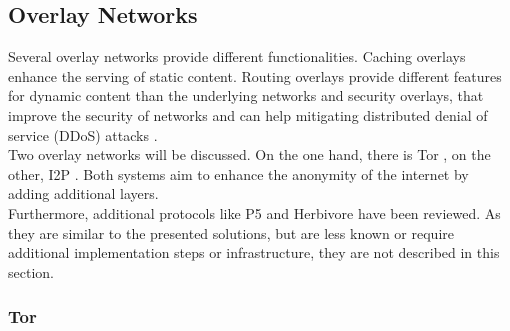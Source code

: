     \subsection{Overlay Networks}
        \label{subsec:related:overlay}
        Several overlay networks provide different functionalities. Caching overlays enhance the serving of static content. Routing overlays provide different features for dynamic content than the underlying networks and security overlays, that improve the security of networks and can help mitigating distributed denial of service (DDoS) attacks \cite{pathan_overlay_2014}.\\
        Two overlay networks will be discussed. On the one hand, there is Tor \cite{dingledine_tor_2004}, on the other, I2P \cite{zantout_i2p_2011}. Both systems aim to enhance the anonymity of the internet by adding additional layers.\\
        Furthermore, additional protocols like P5 \cite{sherwood_p_2005} and Herbivore \cite{goel_herbivore_2003} have been reviewed. As they are similar to the presented solutions, but are less known or require additional implementation steps or infrastructure, they are not described in this section.
     
     
    \subsubsection{Tor}
    
